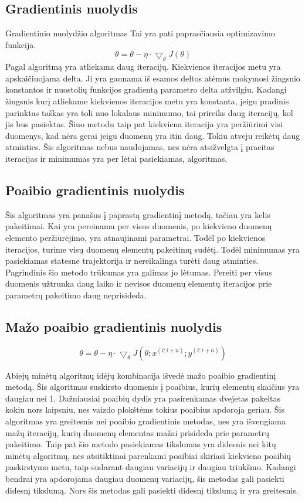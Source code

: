 \documentclass{VUMIFInfKursinis}
\begin{document}
\subsection{Gradientinis nuolydis}
Gradientinio nuolydžio algoritmas
Tai yra pati paprasčiausia optimizavimo funkcija.
\[
\theta = \theta - \eta \cdot \bigtriangledown_{\theta}J(\theta)
\]
Pagal algoritmą yra atliekama daug iteracijų. Kiekvienos iteracijos metu yra
apskaičiuojama delta. Ji yra gaunama iš esamos deltos atėmus mokymosi žingsnio konstantos
ir nuostolių funkcijos gradientą parametro delta atžvilgiu. Kadangi žingsnis kurį
atliekame kiekvienos iteracijos metu yra konstanta, jeigu pradinis parinktas taškas
yra toli nuo lokalaus minimumo, tai prireiks daug iteracijų, kol jis bus pasiektas.
Šiuo metodu taip pat kiekviena iteracija yra peržiūrimi visi duomenys, kad nėra
gerai jeigu duomenų yra itin daug. \cite{salt8} Tokiu atveju reikėtų daug atminties. Šis algoritmas nebus naudojamas, nes nėra
atsižvelgta į praeitas iteracijas ir minimumas yra per lėtai pasiekiamas, algoritmas.

\subsection{Poaibio gradientinis nuolydis}
 Šis algoritmas yra panašus į paprastą gradientinį metodą, tačiau yra kelis pakeitimai.
 Kai yra pereinama per visus duomenis, po kiekvieno duomenų elemento peržiūrėjimo,
 yra atnaujinami parametrai. Todėl po kiekvienos iteracijos, turime visų duomenų
 elementų pakeitimų sudėtį. Todėl minimumas yra pasiekiamas statesne trajektorija ir
 nereikalinga turėti daug atminties. Pagrindinis šio metodo trūkumas yra galimas jo
 lėtumas. Pereiti per visus duomenis užtrunka daug laiko ir nevisos duomenų elementų
 iteracijos prie parametrų pakeitimo daug neprisideda. \cite{salt9}

\subsection{Mažo poaibio gradientinis nuolydis}
\[
\theta = \theta - \eta \cdot \bigtriangledown_{\theta}J(\theta;x^{(i:i+n)};y^{(i:i+n)})
\]
\par
Abiejų minėtų algoritmų idėjų kombinacija išvedė mažo poaibio gradientinį metodą.
Šis algoritmas suskirsto duomenis į poaibius, kurių elementų skaičius yra daugiau nei 1.
Dažniausiai poaibių dydis yra pasirenkamas dvejetas pakeltas kokiu nors laipsniu, nes
vaizdo plokštėms tokius poaibius apdoroja geriau. Šis algoritmas yra greitesnis nei poaibio
gradientinis metodas, nes yra išvengiama mažų iteracijų, kurių duomenų elementas mažai
prisideda prie parametrų pakeitimo. Taip pat šio metodo pasiekiamas tikslumas yra didesnis
nei kitų minėtų algoritmų, nes atsitiktinai parenkami poaibiai skiriasi kiekvieno
poaibių paskirstymo metu, taip sudarant daugiau variacijų ir daugiau triukšmo. Kadangi
bendrai yra apdorojama daugiau duomenų variacijų, šis metodas gali pasiekti didesnį
tikslumą. Nors šis metodas gali pasiekti didesnį tikslumą ir yra greitesnis. \cite{salt9}
\end{document}
